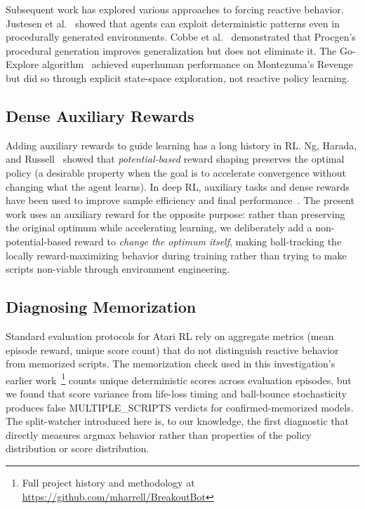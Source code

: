 \documentclass[11pt]{article}
\begin{document}
Subsequent work has explored various approaches to forcing reactive behavior.
Justesen et al.~\cite{justesen2018illuminating} showed that agents can exploit
deterministic patterns even in procedurally generated environments. Cobbe et
al.~\cite{cobbe2020procgen} demonstrated that Procgen's procedural generation
improves generalization but does not eliminate it. The Go-Explore
algorithm~\cite{ecoffet2021goexplore} achieved superhuman performance on Montezuma's
Revenge but did so through explicit state-space exploration, not reactive
policy learning.

\subsection{Dense Auxiliary Rewards}

Adding auxiliary rewards to guide learning has a long history
in RL. Ng, Harada, and Russell~\cite{ng1999shaping} showed that
\emph{potential-based} reward shaping preserves the optimal policy (a
desirable property when the goal is to accelerate convergence without changing
what the agent learns). In deep RL, auxiliary tasks and dense rewards have
been used to improve sample efficiency and final performance~\cite{jaderberg2017auxiliary}.
The present work uses an auxiliary reward for the opposite purpose: rather than
preserving the original optimum while accelerating learning, we deliberately add
a non-potential-based reward to \emph{change the optimum itself}, making
ball-tracking the locally reward-maximizing behavior during training rather
than trying to make scripts non-viable through environment engineering.

\subsection{Diagnosing Memorization}

Standard evaluation protocols for Atari RL rely on aggregate metrics (mean
episode reward, unique score count) that do not distinguish reactive behavior
from memorized scripts. The memorization check used in this investigation's
earlier work~\footnote{Full project history and methodology at
\url{https://github.com/mharrell/BreakoutBot}} counts unique deterministic
scores across evaluation episodes, but we found that score variance from
life-loss timing and ball-bounce stochasticity produces false MULTIPLE\_SCRIPTS
verdicts for confirmed-memorized models. The split-watcher introduced here is,
to our knowledge, the first diagnostic that directly measures argmax behavior
rather than properties of the policy distribution or score distribution.
\end{document}
